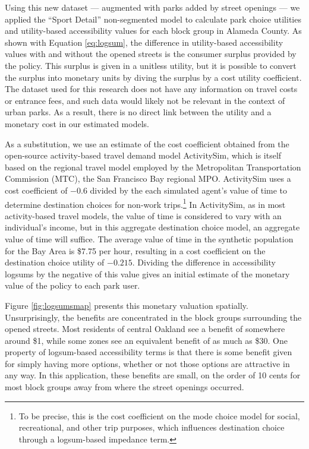 \documentclass[3p, authoryear]{elsarticle} %
\begin{document}
Using this new dataset --- augmented with parks added by street openings --- we
applied the ``Sport Detail'' non-segmented model to calculate park choice utilities
and utility-based accessibility values for each block group in Alameda County.
As shown with Equation \eqref{eq:logsum}, the difference in utility-based
accessibility values with and without the opened streets is the consumer
surplus provided by the policy. This surplus is given in a unitless utility,
but it is possible to convert the surplus into monetary units by diving the
surplus by a cost utility coefficient. The dataset used for this research does
not have any information on travel costs or entrance fees, and such data would
likely not be relevant in the context of urban parks. As a result, there is no
direct link between the utility and a monetary cost in our estimated models.

As a substitution, we use an estimate of the cost coefficient obtained from the
open-source activity-based travel demand model ActivitySim, which is itself
based on the regional travel model employed by the Metropolitan
Transportation Commission (MTC), the San Francisco Bay regional MPO.
ActivitySim uses a cost coefficient of
\(-0.6\) divided by the each simulated agent's value of time to determine
destination choices for non-work trips.\footnote{To be precise, this is the cost
  coefficient on the mode choice model for social, recreational, and other trip
  purposes, which influences destination choice through a logsum-based impedance
  term.} In ActivitySim, as in most activity-based travel models, the value of
time is considered to vary with an individual's income, but in this aggregate
destination choice model, an aggregate value of time will suffice. The average
value of time in the synthetic population for the Bay Area is \$7.75
per hour, resulting in a cost coefficient on the destination choice utility of
\(-0.215\). Dividing the difference in accessibility logsums by the negative of
this value gives an initial estimate of the monetary value of the policy
to each park user.

Figure \ref{fig:logsumsmap} presents this monetary valuation spatially.
Unsurprisingly, the benefits are concentrated in the block groups surrounding
the opened streets. Most residents of central Oakland see a benefit of somewhere
around \$1, while some zones see an equivalent benefit of as much as \$30. One
property of logsum-based accessibility terms is that there is some benefit given
for simply having more options, whether or not those options are attractive in
any way. In this application, these benefits are small, on the order of 10 cents
for most block groups away from where the street openings occurred.
\end{document}
